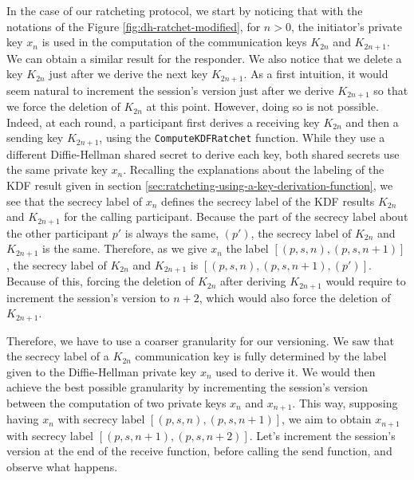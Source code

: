 In the case of our ratcheting protocol, we start by noticing that with the notations of the Figure \ref{fig:dh-ratchet-modified}, for $n>0$, the initiator's private key $x_n$ is used in the computation of the communication keys $K_{2n}$ and $K_{2n+1}$. We can obtain a similar result for the responder.
We also notice that we delete a key $K_{2n}$ just after we derive the next key $K_{2n+1}$.
As a first intuition, it would seem natural to increment the session's version just after we derive $K_{2n+1}$ so that we force the deletion of $K_{2n}$ at this point.
However, doing so is not possible.
Indeed, at each round, a participant first derives a receiving key $K_{2n}$ and then a sending key $K_{2n+1}$, using the \texttt{ComputeKDFRatchet} function.
While they use a different Diffie-Hellman shared secret to derive each key, both shared secrets use the same private key $x_n$.
Recalling the explanations about the labeling of the KDF result given in section \ref{sec:ratcheting-using-a-key-derivation-function}, we see that the secrecy label of $x_{n}$ defines the secrecy label of the KDF results $K_{2n}$ and $K_{2n+1}$ for the calling participant.
Because the part of the secrecy label about the other participant $p'$ is always the same, $(p')$, the secrecy label of $K_{2n}$ and $K_{2n+1}$ is the same.
Therefore, as we give $x_{n}$ the label $[(p,s,n),(p,s,n+1)]$, the secrecy label of $K_{2n}$ and $K_{2n+1}$ is $[(p,s,n),(p,s,n+1),(p')]$.
Because of this, forcing the deletion of $K_{2n}$ after deriving $K_{2n+1}$ would require to increment the session's version to $n+2$, which would also force the deletion of $K_{2n+1}$.

Therefore, we have to use a coarser granularity for our versioning.
We saw that the secrecy label of a $K_{2n}$ communication key is fully determined by the label given to the Diffie-Hellman private key $x_{n}$ used to derive it.
We would then achieve the best possible granularity by incrementing the session's version between the computation of two private keys $x_{n}$ and $x_{n+1}$.
This way, supposing having $x_{n}$ with secrecy label $[(p,s,n),(p,s,n+1)]$, we aim to obtain $x_{n+1}$ with secrecy label $[(p,s,n+1),(p,s,n+2)]$.
Let's increment the session's version at the end of the receive function, before calling the send function, and observe what happens.

